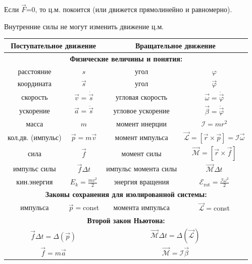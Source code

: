 Если $\vec{F}$=0, то ц.м. покоится (или движется прямолинейно и равномерно).

Внутренние силы не могут изменить движение ц.м.
\newpage
\noindent
\begin{tabular}{|cc||cc|} \hline
\multicolumn{2}{|c||}{\rule[-5mm]{0mm}{13mm}\bf Поступательное движение} &
\multicolumn{2}{c|}{\bf Вращательное движение}\\ \hline\hline
\multicolumn{4}{|c|}{\color{blue}\bf Физические величины и понятия:\rule[-5mm]{0mm}{15mm}}\\ \hline
расстояние \rule[-5mm]{0mm}{13mm}& $s$ & угол & $\varphi$\\ \hline
координата \rule[-5mm]{0mm}{13mm}& $\vec{s}$ & угол & $\vec{\varphi}$\\ \hline
скорость \rule[-5mm]{0mm}{13mm}& $\vec{v}=\dot{\vec{s}}$ & угловая скорость & $\vec{\omega}=\dot{\vec{\varphi}}$\\ \hline
ускорение \rule[-5mm]{0mm}{13mm}& $\vec{a}=\ddot{\vec{s}}$ & угловое ускорение & $\vec{\beta}=\ddot{\vec{\varphi}}$\\ \hline
масса \rule[-5mm]{0mm}{13mm}& $m$ & момент инерции & $\mathcal{I}=mr^2$\\ \hline
кол.дв. (импульс)\rule[-5mm]{0mm}{13mm}&$\vec{p}=m\vec{v}$ & момент импульса & $\vec{\mathcal{L}}=\left[\vec{r}\times\vec{p}\right]=\mathcal{I}\vec{\omega}$ \\ \hline
сила \rule[-5mm]{0mm}{13mm}&$\vec{f}$ & момент силы & $\vec{\mathcal{M}}=\left[\vec{r}\times\vec{f}\right]$ \\ \hline
импульс силы \rule[-5mm]{0mm}{13mm}&$\vec{f}\Delta t$ & импульс момента силы & $\vec{\mathcal{M}}\Delta t$ \\ \hline
кин.энергия \rule[-5mm]{0mm}{13mm}&$E_k=\frac{mv^2}2$ & энергия вращения &
$\mathcal{E}_{\mathrm{rot}}=\frac{\mathcal{I}\omega^2}2$ \\ \hline\hline
\multicolumn{4}{|c|}{\color{blue}\bf Законы сохранения для изолированной системы:\rule[-5mm]{0mm}{15mm}}\\ \hline
импульса\rule[-5mm]{0mm}{13mm}&$\vec{p}=$const&
момента импульса&$\vec{\mathcal{L}}=$const\\ \hline\hline
\multicolumn{4}{|c|}{\color{blue}\bf Второй закон Ньютона:\rule[-5mm]{0mm}{15mm}}\\ \hline
\multicolumn{2}{|c||}{\rule[-5mm]{0mm}{13mm}$\vec{f}\Delta t = \Delta(\vec{p})$}&
\multicolumn{2}{c|}{$\vec{\mathcal{M}}\Delta t = \Delta(\vec{\mathcal{L}})$}\\ \hline
\multicolumn{2}{|c||}{\rule[-5mm]{0mm}{13mm}$\vec{f} = m\vec{a}$}&
\multicolumn{2}{c|}{$\vec{\mathcal{M}} = \mathcal{I}\vec{\beta}$}\\ \hline
\end{tabular}
